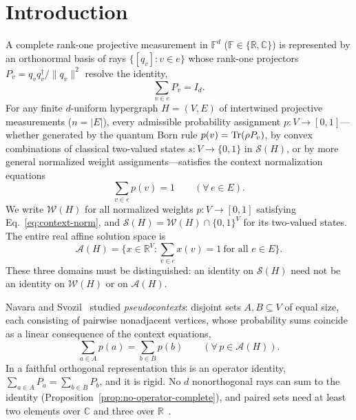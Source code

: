 \documentclass[aps,pra,reprint,superscriptaddress,longbibliography,nofootinbib,floatfix,10pt]{revtex4-2}
\theoremstyle{definition}\newtheorem{definition}[theorem]{Definition}
\theoremstyle{remark}\newtheorem{remark}[theorem]{Remark}
\newcommand{\C}{\mathbb C}\newcommand{\R}{\mathbb R}\newcommand{\Q}{\mathbb Q}
\newcommand{\F}{\mathbb F}\newcommand{\Z}{\mathbb Z}\newcommand{\PP}{\mathbb P}
\newcommand{\Sc}{\mathcal S}\newcommand{\Cc}{\mathcal C}\newcommand{\Wc}{\mathcal W}
\begin{document}
\section{Introduction}\label{sec:intro}

A complete rank-one projective measurement in $\F^d$ ($\F\in\{\R,\C\}$) is represented by an orthonormal basis of rays $\{[q_v]:v\in e\}$ whose rank-one projectors $P_v=q_v q_v^\dagger/\|q_v\|^2$ resolve the identity,
\begin{equation}\label{eq:projector-completeness}
\sum_{v\in e} P_v = I_d.
\end{equation}
For any finite $d$-uniform hypergraph $H=(V,E)$ of intertwined projective measurements ($n=|E|$), every admissible probability assignment $p:V\to[0,1]$---whether generated by the quantum Born rule $p(v)=\operatorname{Tr}(\rho P_v)$, by convex combinations of classical two-valued states $s:V\to\{0,1\}$ in $\Sc(H)$, or by more general normalized weight assignments---satisfies the context normalization equations
\begin{equation}\label{eq:context-norm}
\sum_{v\in e} p(v) = 1 \qquad (\forall\, e\in E).
\end{equation}
We write $\Wc(H)$ for all normalized weights $p:V\to[0,1]$ satisfying Eq.~\eqref{eq:context-norm}, and $\Sc(H)=\Wc(H)\cap\{0,1\}^{V}$ for its two-valued states. The entire real affine solution space is
\begin{equation}\label{eq:affine-weight-space}
\mathcal A(H)=\bigl\{x\in\R^{V}:\sum_{v\in e}x(v)=1\ \text{for all }e\in E\bigr\}.
\end{equation}
These three domains must be distinguished: an identity on $\Sc(H)$ need not be an identity on $\Wc(H)$ or on $\mathcal A(H)$.

Navara and Svozil~\cite{2023-navara-svozil,2026-Navara-Svozil-pseudocontexts} studied \emph{pseudocontexts}: disjoint sets $A,B\subseteq V$ of equal size, each consisting of pairwise nonadjacent vertices, whose probability sums coincide as a linear consequence of the context equations,
\begin{equation}\label{eq:paired-sum}
\sum_{a\in A} p(a) = \sum_{b\in B} p(b) \qquad (\forall\, p\in\mathcal A(H)).
\end{equation}
In a faithful orthogonal representation this is an operator identity, $\sum_{a\in A}P_a=\sum_{b\in B}P_b$, and it is rigid. No $d$ nonorthogonal rays can sum to the identity (Proposition~\ref{prop:no-operator-complete}), and paired sets need at least two elements over $\C$ and three over $\R$~\cite{2026-Navara-Svozil-pseudocontexts,2026-Navara-Svozil-complex-only-3d-hypergraphs}.
\end{document}
